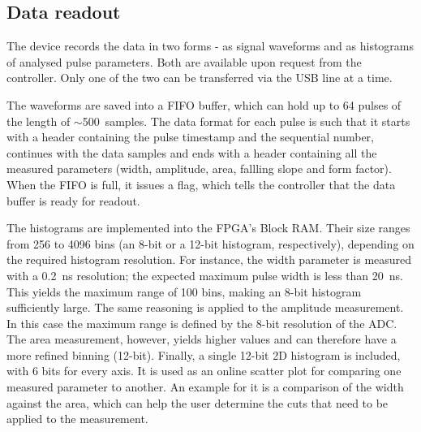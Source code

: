 \subsection{Data readout}
The device records the data in two forms - as signal waveforms and as histograms of analysed pulse parameters. Both are available upon request from the controller. Only one of the two can be transferred via the USB line at a time. 

The waveforms are saved into a FIFO buffer, which can hold up to 64 pulses of the length of $\sim$500~samples. The data format for each pulse is such that it starts with a header containing the pulse timestamp and the sequential number, continues with the data samples and ends with a header containing all the measured parameters (width, amplitude, area, fallling slope and form factor). When the FIFO is full, it issues a flag, which tells the controller that the data buffer is ready for readout. 

The histograms are implemented into the FPGA's Block RAM. Their size ranges from 256 to 4096 bins (an 8-bit or a 12-bit histogram, respectively), depending on the required histogram resolution. For instance, the width parameter is measured with a 0.2~ns resolution; the expected maximum pulse width is less than 20~ns. This yields the maximum range of 100 bins, making an 8-bit histogram sufficiently large. The same reasoning is applied to the amplitude measurement. In this case the maximum range is defined by the 8-bit resolution of the ADC. The area measurement, however, yields higher values and can therefore have a more refined binning (12-bit). Finally, a single 12-bit 2D histogram is included, with 6 bits for every axis. It is used as an online scatter plot for comparing one measured parameter to another. An example for it is a comparison of the width against the area, which can help the user determine the cuts that need to be applied to the measurement.




























